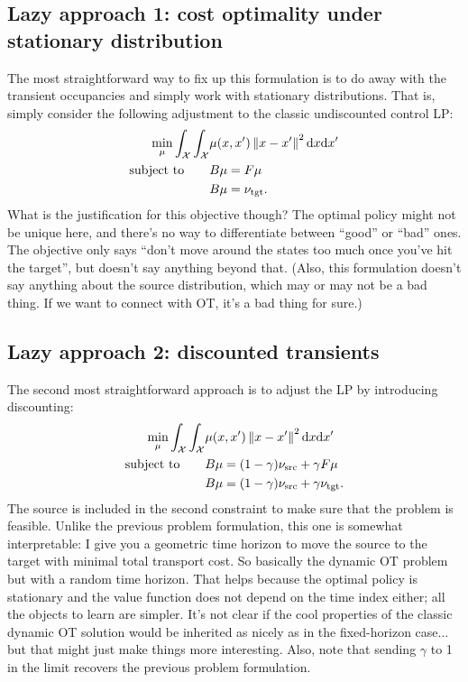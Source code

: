 \documentclass[twoside,10pt]{jmlr}
\begin{document}
\subsection{Lazy approach 1: cost optimality under stationary distribution}
The most straightforward way to fix up this formulation is to do away with the transient occupancies and simply work 
with stationary distributions. That is, simply consider the following adjustment to the classic undiscounted control LP:
\begin{align*}
 \min_{\mu} \int_{\mathcal{X}} \int_{\mathcal{X}} &\mu(x,x') \left\lVert x-x'\right\rVert^2 \mathrm{d} x \mathrm{d} x'
 \\
 \mbox{subject to} \qquad & B\mu = F\mu
 \\
 & B\mu = \nu_{\text{tgt}}.
\end{align*}
What is the justification for this objective though? The optimal policy might not be unique here, and there's no way to 
differentiate between ``good'' or ``bad'' ones. The objective only says ``don't move around the states too much once 
you've hit the target'', but doesn't say anything beyond that. (Also, this formulation doesn't say anything about the 
source distribution, which may or may not be a bad thing. If we want to connect with OT, it's a bad thing for sure.)

\subsection{Lazy approach 2: discounted transients}
The second most straightforward approach is to adjust the LP by introducing discounting:
\begin{align*}
 \min_{\mu} \int_{\mathcal{X}} \int_{\mathcal{X}} &\mu(x,x') \left\lVert x-x'\right\rVert^2 \mathrm{d} x \mathrm{d} x'
 \\
 \mbox{subject to} \qquad & B\mu = (1-\gamma)\nu_{\text{src}} + \gamma F\mu
 \\
 & B\mu = (1-\gamma)\nu_{\text{src}} + \gamma \nu_{\text{tgt}}.
\end{align*}
The source is included in the second constraint to make sure that the problem is feasible. Unlike the previous problem 
formulation, this one is somewhat interpretable: I give you a geometric time horizon to move the source to the target 
with minimal total transport cost. So basically the dynamic OT problem but with a random time horizon. That helps 
because the optimal policy is stationary and the value function does not depend on the time index either; all the 
objects to learn are simpler. It's not clear if the cool properties of the classic dynamic OT solution would be 
inherited as nicely as in the fixed-horizon case... but that might just make things more interesting. Also, note that 
sending $\gamma$ to 1 in the limit recovers the previous problem formulation.












\end{document}
